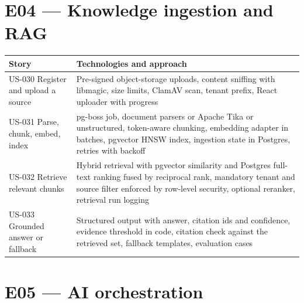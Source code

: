 \section{E04 --- Knowledge ingestion and RAG}

{\small
\begin{longtable}{@{}>{\raggedright\arraybackslash}p{}>{\raggedright\arraybackslash}p{}@{}}
\toprule
\textbf{Story} & \textbf{Technologies and approach} \\
\midrule
\endhead
\bottomrule
\endfoot
US-030 Register and upload a source & Pre-signed object-storage uploads, content sniffing with libmagic, size limits, ClamAV scan, tenant prefix, React uploader with progress \\
US-031 Parse, chunk, embed, index & pg-boss job, document parsers or Apache Tika or unstructured, token-aware chunking, embedding adapter in batches, pgvector HNSW index, ingestion state in Postgres, retries with backoff \\
US-032 Retrieve relevant chunks & Hybrid retrieval with pgvector similarity and Postgres full-text ranking fused by reciprocal rank, mandatory tenant and source filter enforced by row-level security, optional reranker, retrieval run logging \\
US-033 Grounded answer or fallback & Structured output with answer, citation ids and confidence, evidence threshold in code, citation check against the retrieved set, fallback templates, evaluation cases \\
\end{longtable}
}

\section{E05 --- AI orchestration}

